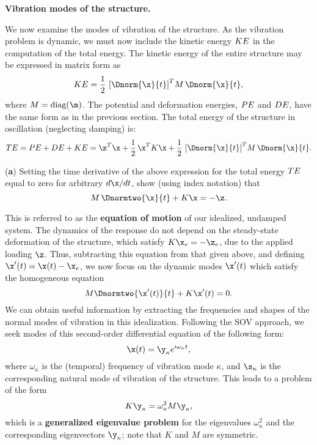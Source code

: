\begin{exercise} \label{ex:04.Truss;3} \rm {\bf Vibration modes of the structure.}\vskip0.05in

We now examine the modes of vibration of the structure.  As the
vibration problem is dynamic, we must now include the kinetic energy
$KE$ in the computation of the total energy.  The kinetic energy of
the entire structure may be expressed in matrix form as
\begin{equation*}
\KE = {1\over 2}\, \left[\Dnorm{\x}{t}\right]^T \! M\,\Dnorm{\x}{t},
\end{equation*}
where $M=\textrm{diag}(\m)$.  The potential and deformation energies,
$PE$ and $DE$, have the same form as in the previous section.  The
total energy of the structure in oscillation (neglecting damping) is:
\begin{equation*}
\TE = \PE+\DE+\KE = \z^T \x + {1\over 2}\,\x^T K \x + {1\over 2}\,\left[\Dnorm{\x}{t}\right]^T \! M\, \Dnorm{\x}{t}.
\end{equation*}\vskip0.1in

\noindent ({\bf a}) Setting the time derivative of the above expression
for the total energy $TE$ equal to zero for arbitrary $d\x/dt$,
show (using index notation) that
\begin{equation*}
M\,\Dnormtwo{\x}{t} + K \x = -\z.
\end{equation*}\vskip0.1in

\noindent This is referred to as the {\bf equation of motion} of our idealized,
undamped system.  The dynamics of the response do not depend on the
steady-state deformation of the structure, which satisfy $K \x_e = -\z_e$, due to
the applied loading $\z$.  Thus, subtracting this equation from that given above, and defining $\x'(t)=\x(t)-\x_e$, we now focus on the dynamic
modes $\x'(t)$ which satisfy the homogeneous equation
\begin{equation*}
M\Dnormtwo{\x'(t)}{t} + K \x'(t) = 0.
\end{equation*}
We can obtain useful information by extracting the frequencies and
shapes of the normal modes of vibration in this idealization.
Following the SOV approach, we seek modes of this second-order differential equation of the following form:
\begin{equation}
\x(t) = \y_\kappa e^{\imath \omega_\kappa t},
\label{eq:trussexp}
\end{equation}
where $\omega_\kappa$ is the (temporal) frequency of vibration mode $\kappa$, and $\s_\kappa$ is the corresponding natural mode of
vibration of the structure.  This leads to a problem of the form
\begin{equation}
K \y_\kappa = \omega^2_\kappa M \y_\kappa,
\label{eq:trussgenprob}
\end{equation}
which is a {\bf generalized eigenvalue problem} for the eigenvalues $\omega^2_\kappa$ and the corresponding eigenvectors $\y_\kappa$; note that $K$ and $M$ are symmetric.\vskip0.1in


\end{exercise}
